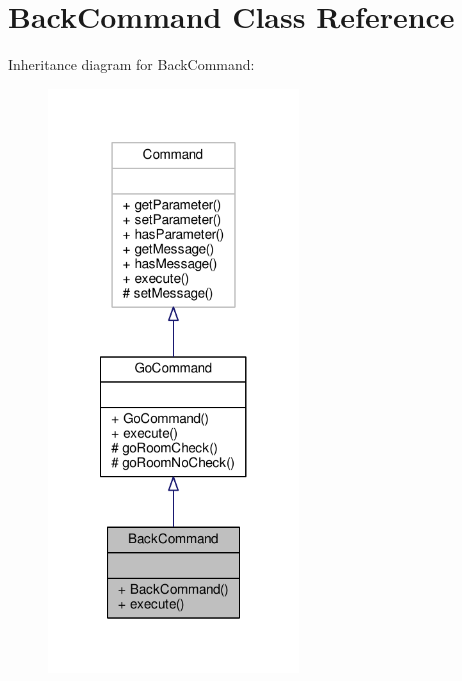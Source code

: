 \hypertarget{classBackCommand}{\section{Back\-Command Class Reference}
\label{classBackCommand}
}


Inheritance diagram for Back\-Command\-:
\nopagebreak
\begin{figure}[H]
\begin{center}
\leavevmode
\includegraphics[width=188pt]{classBackCommand__inherit__graph}
\end{center}
\end{figure}


